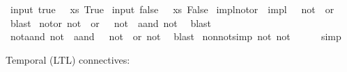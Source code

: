 \begin{isabellebody}
\isanewline
{}\isamarkupfalse%
\ {\isacharparenleft}input{\isacharparenright}\ {\isachardoublequoteopen}true\ {\isasymequiv}\ {\isasymlambda}\ xs{\isachardot}\ True{\isachardoublequoteclose}\isanewline
\isanewline
{}\isamarkupfalse%
\ {\isacharparenleft}input{\isacharparenright}\ {\isachardoublequoteopen}false\ {\isasymequiv}\ {\isasymlambda}\ xs{\isachardot}\ False{\isachardoublequoteclose}\isanewline
\isanewline
{}\isamarkupfalse%
\ impl{\isacharunderscore}not{\isacharunderscore}or{\isacharcolon}\ {\isachardoublequoteopen}{\isasymphi}\ impl\ {\isasympsi}\ {\isacharequal}\ {\isacharparenleft}not\ {\isasymphi}{\isacharparenright}\ or\ {\isasympsi}{\isachardoublequoteclose}\isanewline
%
\isadelimproof
%
\endisadelimproof
%
\isatagproof
{}\isamarkupfalse%
\ blast%
\endisatagproof
{\isafoldproof}%
%
\isadelimproof
\isanewline
%
\endisadelimproof
\isanewline
{}\isamarkupfalse%
\ not{\isacharunderscore}or{\isacharcolon}\ {\isachardoublequoteopen}not\ {\isacharparenleft}{\isasymphi}\ or\ {\isasympsi}{\isacharparenright}\ {\isacharequal}\ {\isacharparenleft}not\ {\isasymphi}{\isacharparenright}\ aand\ {\isacharparenleft}not\ {\isasympsi}{\isacharparenright}{\isachardoublequoteclose}\isanewline
%
\isadelimproof
%
\endisadelimproof
%
\isatagproof
{}\isamarkupfalse%
\ blast%
\endisatagproof
{\isafoldproof}%
%
\isadelimproof
\isanewline
%
\endisadelimproof
\isanewline
{}\isamarkupfalse%
\ not{\isacharunderscore}aand{\isacharcolon}\ {\isachardoublequoteopen}not\ {\isacharparenleft}{\isasymphi}\ aand\ {\isasympsi}{\isacharparenright}\ {\isacharequal}\ {\isacharparenleft}not\ {\isasymphi}{\isacharparenright}\ or\ {\isacharparenleft}not\ {\isasympsi}{\isacharparenright}{\isachardoublequoteclose}\isanewline
%
\isadelimproof
%
\endisadelimproof
%
\isatagproof
{}\isamarkupfalse%
\ blast%
\endisatagproof
{\isafoldproof}%
%
\isadelimproof
\isanewline
%
\endisadelimproof
\isanewline
{}\isamarkupfalse%
\ non{\isacharunderscore}not{\isacharbrackleft}simp{\isacharbrackright}{\isacharcolon}\ {\isachardoublequoteopen}not\ {\isacharparenleft}not\ {\isasymphi}{\isacharparenright}\ {\isacharequal}\ {\isasymphi}{\isachardoublequoteclose}%
\isadelimproof
\ %
\endisadelimproof
%
\isatagproof
{}\isamarkupfalse%
\ simp%
\endisatagproof
{\isafoldproof}%
%
\isadelimproof
%
\endisadelimproof
%
\begin{isamarkuptext}%
Temporal (LTL) connectives:%
\end{isamarkuptext}\isamarkuptrue%

\end{isabellebody}
